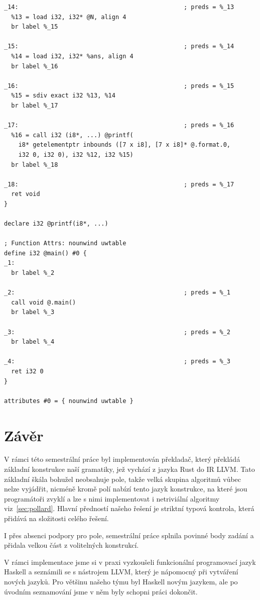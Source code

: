 \documentclass[12pt,a4paper]{article}
\begin{document}
\begin{verbatim}
_14:                                              ; preds = %_13
  %13 = load i32, i32* @N, align 4
  br label %_15

_15:                                              ; preds = %_14
  %14 = load i32, i32* %ans, align 4
  br label %_16

_16:                                              ; preds = %_15
  %15 = sdiv exact i32 %13, %14
  br label %_17

_17:                                              ; preds = %_16
  %16 = call i32 (i8*, ...) @printf(
    i8* getelementptr inbounds ([7 x i8], [7 x i8]* @.format.0,
    i32 0, i32 0), i32 %12, i32 %15)
  br label %_18

_18:                                              ; preds = %_17
  ret void
}

declare i32 @printf(i8*, ...)

; Function Attrs: nounwind uwtable
define i32 @main() #0 {
_1:
  br label %_2

_2:                                               ; preds = %_1
  call void @.main()
  br label %_3

_3:                                               ; preds = %_2
  br label %_4

_4:                                               ; preds = %_3
  ret i32 0
}

attributes #0 = { nounwind uwtable }
\end{verbatim}



\section{Závěr}



V rámci této semestrální práce byl implementován překladač, který překládá základní konstrukce naší gramatiky, jež vychází z jazyka Rust do IR LLVM. Tato základní škála bohužel neobsahuje pole, takže velká skupina algoritmů vůbec nelze vyjádřit, nicméně kromě polí nabízí tento jazyk konstrukce, na které jsou programátoři zvyklí a lze s nimi implementovat i netriviální algoritmy viz~\ref{sec:pollard}. Hlavní předností našeho řešení je striktní typová kontrola, která přidává na složitosti celého řešení.

I přes absenci podpory pro pole, semestrální práce splnila povinné body zadání a přidala velkou část z volitelných konstrukcí.

V rámci implementace jsme si v praxi vyzkoušeli funkcionální programovací jazyk Haskell a seznámili se s nástrojem LLVM, který je nápomocný při vytváření nových jazyků. Pro většinu našeho týmu byl Haskell novým jazykem, ale po úvodním seznamování jsme v něm byly schopni práci dokončit.
\end{document}
